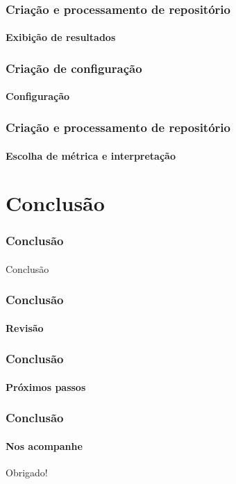 \documentclass{beamer}
\begin{document}
  \begin{frame}
    \frametitle{Criação e processamento de repositório}
    \framesubtitle{Exibição de resultados}
  \end{frame}

  \begin{frame}
    \frametitle{Criação de configuração}
    \framesubtitle{Configuração}
  \end{frame}

  \begin{frame}
    \frametitle{Criação e processamento de repositório}
    \framesubtitle{Escolha de métrica e interpretação}
  \end{frame}

\section{Conclusão}
\begin{frame}
  \frametitle{Conclusão}
  \framesubtitle{}

  Conclusão
\end{frame}

\begin{frame}
  \frametitle{Conclusão}
  \framesubtitle{Revisão}
\end{frame}

\begin{frame}
  \frametitle{Conclusão}
  \framesubtitle{Próximos passos}
\end{frame}

\begin{frame}
  \frametitle{Conclusão}
  \framesubtitle{Nos acompanhe}

  Obrigado!
\end{frame}
\end{document}
